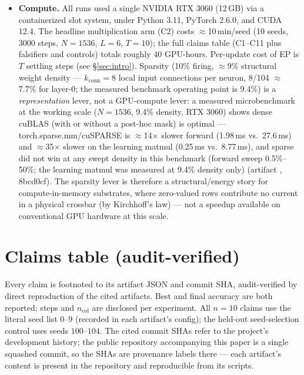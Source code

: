 \documentclass[11pt]{article}
\begin{document}
\begin{itemize}
\item \textbf{Compute.} All runs used a single NVIDIA RTX 3060 (12\,GB) via a containerized slot system, under Python 3.11, PyTorch 2.6.0, and CUDA 12.4. The headline multiplication arm (C2) costs $\approx$10\,min/seed (10 seeds, 3000 steps, $N{=}1536$, $L{=}6$, $T{=}10$); the full claims table (C1--C11 plus falsifiers and controls) totals roughly 40 GPU-hours. Per-update cost of EP is $T$ settling steps (see \S\ref{sec:intro}). Sparsity (10\% firing, $\approx$9\% structural weight density --- $k_{\mathrm{conn}}{=}8$ local input connections per neuron, 8/104 $\approx$ 7.7\% for layer-0; the measured benchmark operating point is 9.4\%) is a \emph{representation} lever, not a GPU-compute lever: a measured microbenchmark at the working scale ($N{=}1536$, 9.4\% density, RTX 3060) shows dense cuBLAS (with or without a post-hoc mask) is optimal --- torch.sparse.mm/cuSPARSE is $\approx$14$\times$ slower forward (1.98\,ms vs.\ 27.6\,ms) and $\approx$35$\times$ slower on the learning matmul (0.25\,ms vs.\ 8.77\,ms), and sparse did not win at any swept density in this benchmark (forward sweep 0.5\%--50\%; the learning matmul was measured at 9.4\% density only) (artifact \texttt{}, 8bcd0cf). The sparsity lever is therefore a structural/energy story for compute-in-memory substrates, where zero-valued rows contribute no current in a physical crossbar (by Kirchhoff's law) --- not a speedup available on conventional GPU hardware at this scale.
\end{itemize}

\appendix
\section{Claims table (audit-verified)}\label{app:claims}
Every claim is footnoted to its artifact JSON and commit SHA, audit-verified by direct reproduction of the cited artifacts. Best and final accuracy are both reported; steps and $n_{\mathrm{col}}$ are disclosed per experiment. All $n{=}10$ claims use the literal seed list $0$--$9$ (recorded in each artifact's config); the held-out seed-selection control uses seeds $100$--$104$. The cited commit SHAs refer to the project's development history; the public repository accompanying this paper is a single squashed commit, so the SHAs are provenance labels there --- each artifact's content is present in the repository and reproducible from its scripts.
\end{document}
